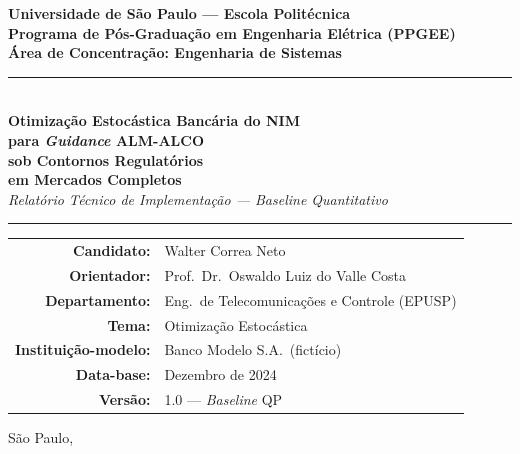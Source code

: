 \documentclass[12pt, a4paper, oneside]{article}
\begin{document}

\begin{titlepage}
  \centering
  \vspace*{1.5cm}

  {\large\bfseries\color{almblue}
    Universidade de São Paulo --- Escola Politécnica\\[0.4em]
    Programa de Pós-Graduação em Engenharia Elétrica (PPGEE)\\[0.3em]
    Área de Concentração: Engenharia de Sistemas
  }

  \vspace{2.5cm}

  \rule{\textwidth}{1.5pt}\\[0.6em]
  {\LARGE\bfseries
    Otimização Estocástica Bancária do NIM\\[0.4em]
    para \textit{Guidance} ALM-ALCO\\[0.4em]
    sob Contornos Regulatórios\\[0.4em]
    em Mercados Completos
  }\\[0.6em]
  {\large\itshape
    Relatório Técnico de Implementação --- \textit{Baseline} Quantitativo
  }\\[0.4em]
  \rule{\textwidth}{1.5pt}

  \vspace{2.0cm}

  \begin{tabular}{rl}
    \textbf{Candidato:}          & Walter Correa Neto \\[0.4em]
    \textbf{Orientador:}         & Prof.\ Dr.\ Oswaldo Luiz do Valle Costa \\[0.4em]
    \textbf{Departamento:}       & Eng.\ de Telecomunicações e Controle (EPUSP) \\[0.4em]
    \textbf{Tema:}               & Otimização Estocástica \\[0.4em]
    \textbf{Instituição-modelo:} & Banco Modelo S.A.\ (fictício) \\[0.4em]
    \textbf{Data-base:}          & Dezembro de 2024 \\[0.4em]
    \textbf{Versão:}             & 1.0 --- \textit{Baseline} QP \\
  \end{tabular}

  \vfill
  {\normalsize São Paulo, \the\year}
\end{titlepage}
\end{document}
